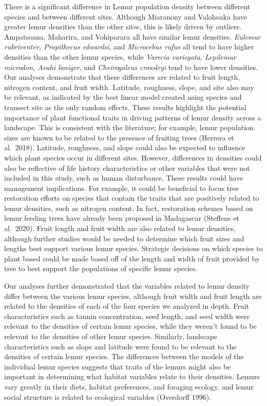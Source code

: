 \documentclass[
  12pt,
]{article}
\begin{document}
There is a significant difference in Lemur population density between
different species and between different sites. Although Miaranony and
Valohoaka have greater lemur densities than the other sites, this is
likely driven by outliers. Ampatsoana, Maharira, and Vohiparara all have
similar lemur densities. \emph{Eulemur rubriventer, Propithecus
edwardsi}, and \emph{Microcebus rufus} all tend to have higher densities
than the other lemur species, while \emph{Varecia variegata, Lepilemur
microdon, Avahi laniger}, and \emph{Cheirogaleus crossleyi} tend to have
lower densities. Our analyses demonstrate that these differences are
related to fruit length, nitrogen content, and fruit width. Latitude,
roughness, slope, and site also may be relevant, as indicated by the
best linear model created using species and transect site as the only
random effects. These results highlight the potential importance of
plant functional traits in driving patterns of lemur density across a
landscape. This is consistent with the literature; for example, lemur
population sizes are known to be related to the presence of fruiting
trees (Herrera et al.~2018). Latitude, roughness, and slope could also
be expected to influence which plant species occur in different sites.
However, differences in densities could also be reflective of life
history characteristics or other variables that were not included in
this study, such as human disturbance. These results could have
management implications. For example, it could be beneficial to focus
tree restoration efforts on species that contain the traits that are
positively related to lemur densities, such as nitrogen content. In
fact, restoration schemes based on lemur feeding trees have already been
proposed in Madagascar (Steffens et al.~2020). Fruit length and fruit
width are also related to lemur densities, although further studies
would be needed to determine which fruit sizes and lengths best support
various lemur species. Strategic decisions on which species to plant
based could be made based off of the length and width of fruit provided
by tree to best support the populations of specific lemur species.

Our analyses further demonstrated that the variables related to lemur
density differ between the various lemur species, although fruit width
and fruit length are related to the densities of each of the four
species we analyzed in depth. Fruit characteristics such as tannin
concentration, seed length, and seed width were relevant to the
densities of certain lemur species, while they weren't found to be
relevant to the densities of other lemur species. Similarly, landscape
characteristics such as slope and latitude were found to be relevant to
the densities of certain lemur species. The differences between the
models of the individual lemur species suggests that traits of the
lemurs might also be important in determining what habitat variables
relate to their densities. Lemurs vary greatly in their diets, habitat
preferences, and foraging ecology, and lemur social structure is related
to ecological variables (Overdorff 1996).
\end{document}
